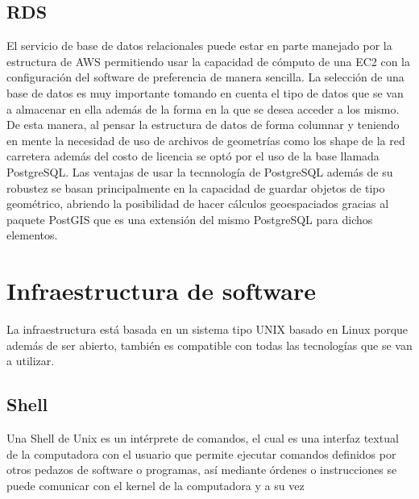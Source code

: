\subsection{RDS}
El servicio de base de datos relacionales puede estar en parte manejado por la estructura de AWS permitiendo usar la capacidad de cómputo de una EC2 con la configuración del software de preferencia de manera sencilla. La selección de una base de datos es muy importante tomando en cuenta el tipo de datos que se van a almacenar en ella además de la forma en la que se desea acceder a los mismo. De esta manera, al pensar la estructura de datos de forma columnar y teniendo en mente la necesidad de uso de archivos de geometrías como los shape de la red carretera además del costo de licencia se optó por el uso de la base llamada PostgreSQL. Las ventajas de usar la tecnnología de PostgreSQL además de su robustez se basan principalmente en la capacidad de guardar objetos de tipo geométrico, abriendo la posibilidad de hacer cálculos geoespaciados gracias al paquete PostGIS que es una extensión del mismo PostgreSQL para dichos elementos.

\section{Infraestructura de software}
La infraestructura está basada en un sistema tipo UNIX basado en Linux porque además de ser abierto, también es compatible con todas las tecnologías que se van a utilizar.\\
\subsection{Shell}
Una Shell de Unix es un intérprete de comandos, el cual es una interfaz textual de la computadora con el usuario que permite ejecutar comandos definidos por otros pedazos de software o programas, así mediante órdenes o instrucciones se puede comunicar con el kernel de la computadora y a su vez
